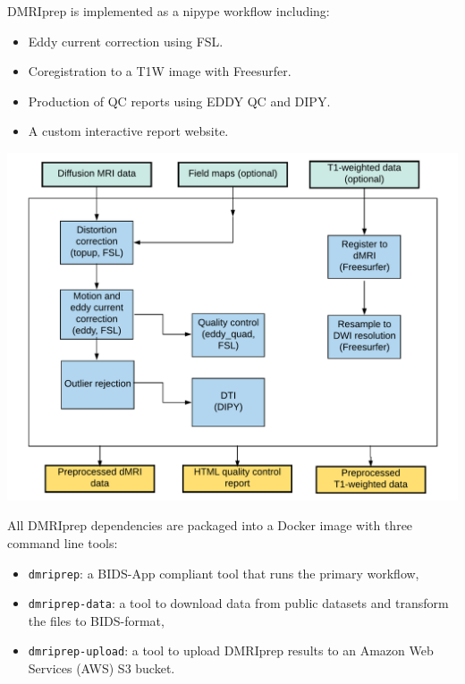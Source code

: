 \documentclass[a0paper,portrait,fontscale=0.395]{baposter}
\newenvironment{Figure}
  {\par\medskip\noindent\minipage{\linewidth}}
  {\endminipage\par\medskip}
\begin{document}
\begin{poster}
{\noindent DMRIprep is implemented as a nipype\cite{gorgolewski2016brain} workflow including:
\begin{itemize}[noitemsep, leftmargin=*]
    \item Eddy current correction using FSL.
    \item Coregistration to a T1W image with Freesurfer.
    \item Production of QC reports using EDDY QC\cite{bastiani2019automated} and DIPY\cite{garyfallidis2014dipy}.
    \item A custom interactive report website.
\end{itemize}
\vspace{-0.5em}
\begin{Figure}
    \centering
    \includegraphics[width=0.82\linewidth]{dmriprep_workflow.pdf}
\end{Figure}

\noindent All DMRIprep dependencies are packaged into a Docker image with three command line tools:
\begin{itemize}[noitemsep, leftmargin=*]
    \item \texttt{dmriprep}: a BIDS-App compliant tool that runs the primary workflow,
    \item \texttt{dmriprep-data}: a tool to download data from public datasets and transform the files to BIDS-format,
    \item \texttt{dmriprep-upload}: a tool to upload DMRIprep results to an Amazon Web Services (AWS) S3 bucket.
\end{itemize}
}


\end{poster}
\end{document}
